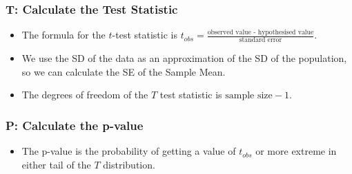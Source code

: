 \documentclass[]{article}
\newenvironment{Shaded}{\begin{snugshade}}{\end{snugshade}}
\newcommand{\DecValTok}[1]{\textcolor[rgb]{0.00,0.00,0.81}{#1}}
\newcommand{\FloatTok}[1]{\textcolor[rgb]{0.00,0.00,0.81}{#1}}
\newcommand{\KeywordTok}[1]{\textcolor[rgb]{0.13,0.29,0.53}{\textbf{#1}}}
\newcommand{\NormalTok}[1]{#1}
\newcommand{\OperatorTok}[1]{\textcolor[rgb]{0.81,0.36,0.00}{\textbf{#1}}}
\newcommand{\StringTok}[1]{\textcolor[rgb]{0.31,0.60,0.02}{#1}}
\providecommand{\tightlist}{%
  \setlength{\itemsep}{0pt}\setlength{\parskip}{0pt}}
\begin{document}
\hypertarget{t-calculate-the-test-statistic}{%
\subsubsection{T: Calculate the Test Statistic}\label{t-calculate-the-test-statistic}}

\begin{itemize}
\item
  The formula for the \(t\)-test statistic is \(t_{obs} = \frac{\mbox{observed value - hypothesised value}}{\mbox{standard error}}\).
\item
  We use the SD of the data as an approximation of the SD of the population, so we can calculate the SE of the Sample Mean.
\end{itemize}

\begin{Shaded}
\end{Shaded}

\begin{itemize}
\tightlist
\item
  The degrees of freedom of the \(T\) test statistic is \(\mbox{sample size} - 1\).
\end{itemize}

\begin{Shaded}
\end{Shaded}

\hypertarget{p-calculate-the-p-value}{%
\subsubsection{P: Calculate the p-value}\label{p-calculate-the-p-value}}

\begin{itemize}
\tightlist
\item
  The p-value is the probability of getting a value of \(t_{obs}\) or more extreme in either tail of the \(T\) distribution.
\end{itemize}
\end{document}
